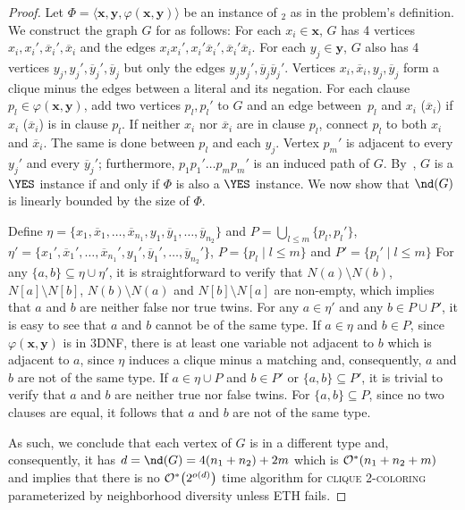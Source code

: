 \begin{proof}
    Let $\Phi = \langle\boldsymbol{x}, \boldsymbol{y}, \varphi(\boldsymbol{x},\boldsymbol{y})\rangle$ be an instance of $_2$ as in the problem's definition.
    We construct the graph $G$ for  as follows:
    For each $x_i \in \boldsymbol{x}$, $G$ has 4 vertices $x_i,x_i',\overline{x}_i',\overline{x}_i$ and the edges $x_ix_i',x_i'\overline{x}_i',\overline{x}_i'\overline{x}_i$.
    For each $y_j \in \boldsymbol{y}$, $G$ also has 4 vertices $y_j,y_j',\overline{y}_j',\overline{y}_j$ but only the edges $y_jy_j',\overline{y}_j\overline{y}_j'$.
    Vertices $x_i,\overline{x}_i, y_j, \overline{y}_j$ form a clique minus the edges between a literal and its negation.
    For each clause $p_l \in \varphi(\boldsymbol{x}, \boldsymbol{y})$, add two vertices $p_l,p_l'$ to $G$ and an edge between~$p_l$ and $x_i$ ($\overline{x}_i$) if $x_i$ ($\overline{x}_i$) is in clause $p_l$. If neither $x_i$ nor $\overline{x}_i$ are in clause $p_l$, connect $p_l$ to both $x_i$ and $\overline{x}_i$.
    The same is done between $p_l$ and each $y_j$.
    Vertex $p_m'$ is adjacent to every $y_j'$ and every $\overline{y}_j'$;
    furthermore, $p_1p_1'\dots p_mp_m'$ is an induced path of $G$.
    By~\cite{clique_coloring_complexity}, $G$ is a $\YES$ instance if and only if $\Phi$ is also a $\YES$ instance.
    We now show that $\nd(G)$ is linearly bounded by the size of $\Phi$.
    
    Define $\eta = \{x_1, \overline{x}_1, \dots, \overline{x}_{n_1}, y_1, \overline{y}_1, \dots, \overline{y}_{n_2}\}$ and $P = \bigcup_{l \leq m}\{p_l, p_l'\}$, $\eta' = \{x_1', \overline{x}_1', \dots, \overline{x}_{n_1}', y_1', \overline{y}_1', \dots, \overline{y}_{n_2}'\}$, $P = \{p_l \mid l \leq m\}$ and $P' = \{p_l' \mid l \leq m\}$
    For any $\{a,b\} \subseteq \eta \cup \eta'$, it is straightforward to verify that $N(a) \setminus N(b)$, $N[a] \setminus N[b]$, $N(b) \setminus N(a)$ and $N[b] \setminus N[a]$ are non-empty, which implies that $a$ and $b$ are neither false nor true twins.
    For any $a \in \eta'$ and any $b \in P \cup P'$, it is easy to see that $a$ and $b$ cannot be of the same type.
    If $a \in \eta$ and $b \in P$, since $\varphi(\boldsymbol{x}, \boldsymbol{y})$ is in 3DNF, there is at least one variable not adjacent to $b$ which is adjacent to $a$, since $\eta$ induces a clique minus a matching and, consequently, $a$ and $b$ are not of the same type.
    If $a \in \eta \cup P$ and $b \in P'$ or $\{a,b\} \subseteq P'$, it is trivial to verify that $a$ and $b$ are neither true nor false twins.
    For $\{a,b\} \subseteq P$, since no two clauses are equal, it follows that $a$ and $b$ are not of the same type.
    
    As such, we conclude that each vertex of $G$ is in a different type and, consequently, it has $d = \nd(G) = 4(n_1 + n_2) + 2m$ which is $\mathcal{O}^*\!\left(n_1 + n_2 + m\right)$ and implies that there is no $\mathcal{O}^*\!\left(2^{o(d)}\right)$ time algorithm for \textsc{clique 2-coloring} parameterized by neighborhood diversity unless ETH fails.
\end{proof}